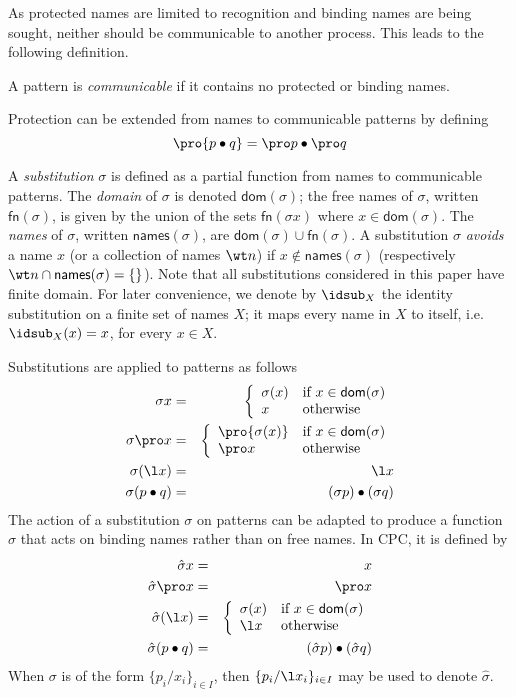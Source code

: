 \documentclass{LMCS}
\begin{document}
As protected names are limited to recognition and binding names are
being sought, neither should be communicable to another process.
This leads to the following definition.
\begin{defi}
\label{def:communicable}
A pattern is {\em communicable} if it contains no protected or binding names.
\end{defi}
Protection can be extended from names to communicable patterns by
defining
$$
\pro {p\bullet q} = \pro p \bullet \pro q
$$

A {\em substitution} $\sigma$ is defined as a partial function from names to communicable patterns.
The {\em domain} of $\sigma$ is denoted $\textsf{dom}(\sigma)$;
the free names of $\sigma$, written $\textsf{fn}(\sigma)$, is given by the union of the sets $\textsf{fn}(\sigma x)$ where $x \in \textsf{dom}(\sigma)$.
The {\em names} of $\sigma$, written $\textsf{names}(\sigma)$, are $\textsf{dom}(\sigma)\cup\textsf{fn}(\sigma)$.
A substitution $\sigma$ {\em avoids} a name $x$ (or a collection of names $\wt n$) if $x\notin\textsf{names}(\sigma)$ (respectively $\wt n\cap\textsf{names}(\sigma)=\{\}$).
Note that all substitutions considered in this paper have finite domain.
For later convenience, we denote by $\idsub_X$ the identity
substitution on a finite set of names $X$; it maps every name in $X$ to
itself, i.e.  $\idsub_X(x) = x$, for every $x\in X$.


Substitutions are applied to patterns as follows
\begin{eqnarray*}
\sigma x &=&
\left\{
\begin{array}{ll}
\sigma (x) & \mbox{if $x \in \textsf{dom}(\sigma)$}\\
x & \mbox{otherwise}
\end{array}
\right. \\
\sigma \pro x &=&
\left\{
\begin{array}{ll}
\pro{\sigma (x)} & \mbox{if $x \in \textsf{dom}(\sigma)$}\\
\pro x & \mbox{otherwise}
\end{array}
\right. \\
\sigma (\l x)&=& \l x\\
\sigma (p\bullet q)&=& (\sigma p)\bullet (\sigma q)
\end{eqnarray*}
The action of a substitution
$\sigma$ on patterns can be adapted to produce a function $\hat\sigma$
that acts on binding names rather than on free names.  In CPC, it is
defined by
\begin{eqnarray*}
\hat\sigma x &=& x\\
\hat\sigma \pro x &=& \pro x\\
\hat\sigma (\l x) &=&
\left\{
\begin{array}{ll}
\sigma(x) &\mbox{if $x \in \textsf{dom}(\sigma)$}\\
\l x &\mbox{otherwise}
\end{array}
\right. \\
\hat\sigma (p\bullet q)&=& (\hat\sigma p)\bullet (\hat\sigma q)
\end{eqnarray*}
When $\sigma$ is of the form $\{p_i/x_i\}_{i \in I}$,
then $\{p_i/\l x_i\}_{i \in I}$ may be used to denote $\hat\sigma$.
\end{document}
